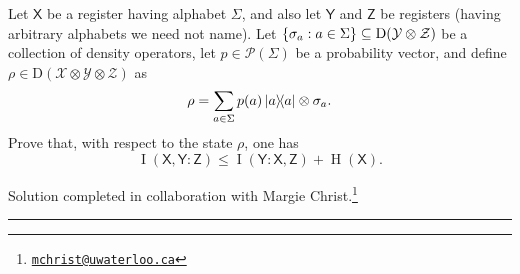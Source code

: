 \documentclass[boxes,pages,color=SeaGreen]{homework}
\newcommand{\collab}[1]{\footnote{\href{mailto:#1}{\texttt{#1}}}}
\renewcommand{\op}[1]{\operatorname{#1}}
\newcommand{\X}{\mathcal{X}}
\newcommand{\Y}{\mathcal{Y}}
\newcommand{\Z}{\mathcal{Z}}
\renewcommand{\P}{\mathcal{P}}
\newcommand{\reg}[1]{\mathsf{#1}}
\newcommand{\Density}{\mathrm{D}}
\begin{document}

\begin{problem}
Let $\reg{X}$ be a register having alphabet $\Sigma$, and also let
$\reg{Y}$ and $\reg{Z}$ be registers (having arbitrary alphabets we need
not name).
Let $\qty{\sigma_a : a \in \Sigma} \subseteq \Density(\Y\otimes\Z)$
be a collection of density operators, let $p \in \P(\Sigma)$ be a probability
vector, and define $\rho \in \Density(\X \otimes \Y \otimes \Z)$ as
\[
    \rho = \sum_{a \in \Sigma} p(a) \ketbra{a} \otimes \sigma_a.
\]
Prove that, with respect to the state $\rho$, one has
\[
    \op{I}(\reg{X},\reg{Y} : \reg{Z})
    \leq \op{I}(\reg{Y} : \reg{X}, \reg{Z}) + \op{H}(\reg{X}).
\]
\end{problem}

\noindent Solution completed in collaboration with Margie Christ.\collab{mchrist@uwaterloo.ca}

{\noindent\color{SeaGreen!30}\rule{\textwidth}{1.5pt}}
\end{document}
